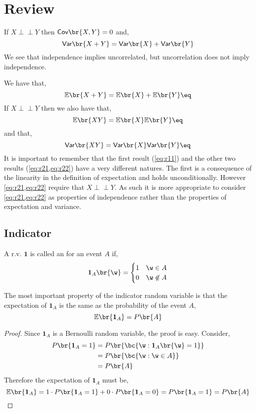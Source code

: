 \documentclass{article}
\newcommand{\indep}{\!\!\perp\!\!\!\!\perp\!\!}
\newcommand{\Cov}{\textsf{Cov}}
\newcommand{\Var}{\textsf{Var}}
\newcommand{\Exp}{\mathbb{E}}
\newcommand{\ind}{\mathbf{1}}
\begin{document}
\titlePage

\tableOfContents

\disclaimer

\section{Review}

If $X \indep Y$ then $\Cov\br{X,Y} = 0$ and,
\[ \Var\br{X+Y} = \Var\br{X} + \Var\br{Y} \]
We see that independence implies uncorrelated, but uncorrelation does not imply independence.

\begin{remark}
    We have that,
    \[ \Exp\br{X + Y} = \Exp\br{X} + \Exp\br{Y} \eq \label{eq:r11}\]
    If $X\indep Y$ then we also have that,
    \[ \Exp\br{XY} = \Exp\br{X}\Exp\br{Y} \eq \label{eq:r21}\]
    and that,
    \[ \Var\br{XY} = \Var\br{X}\Var\br{Y} \eq \label{eq:r22}\]
    It is important to remember that the first result (\cref{eq:r11}) and the other two results (\cref{eq:r21,eq:r22}) have a very different natures. The first is a consequence of the linearity in the definition of expectation and holds unconditionally. However \cref{eq:r21,eq:r22} require that $X \indep Y$. As such it is more appropriate to consider \cref{eq:r21,eq:r22} as properties of independence rather than the properties of expectation and variance.
\end{remark}

\subsection{Indicator}

A r.v. $\ind$ is called an  for an event $A$ if,
\[ \ind_A \br{\w} = \begin{cases}
    1 & \w \in A \\
    0 & \w \not\in A
\end{cases} \]

The most important property of the indicator random variable is that the expectation of $\ind_A$ is the same as the probability of the event $A$,
\[ \Exp\br{\ind_{A}} = P\br{A} \]
\begin{proof}
    Since $\ind_A$ is a Bernoulli random variable, the proof is easy. Consider,
    \begin{align*}
    P\br{\ind_A = 1} &= P\br{\bc{\w: \ind_A\br{\w} = 1}} \\
    &= P\br{\bc{\w: \w \in A}} \\
    &= P\br{A}
    \end{align*}
    Therefore the expectation of $\ind_A$ must be,
    \[ \Exp\br{\ind_A} = 1 \cdot P\br{\ind_A = 1} + 0 \cdot P\br{\ind_A = 0} = P\br{\ind_A = 1} = P\br{A} \]
\end{proof}
\end{document}
